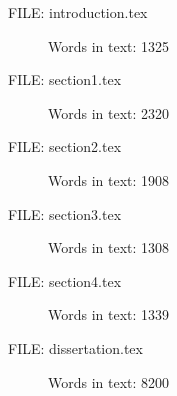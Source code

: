 \documentclass[12pt,a4paper]{article}
\begin{document}
\begin{description}
\item[FILE: introduction.tex]Words in text: 1325
\item[FILE: section1.tex]Words in text: 2320
\item[FILE: section2.tex]Words in text: 1908
\item[FILE: section3.tex]Words in text: 1308
\item[FILE: section4.tex]Words in text: 1339
\item[FILE: dissertation.tex]Words in text: 8200
\end{description}
\end{document}
